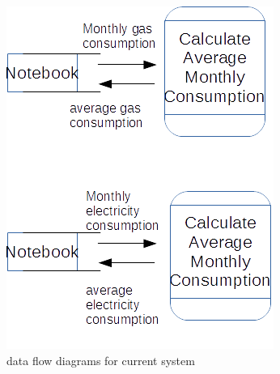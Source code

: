 \begin{figure}[H]
    \includegraphics[width=\textwidth]{./dataflowdiagrams2.png}
    \caption{data flow diagrams for current system} \label{fig:dataflowdiagrams}
\end{figure}

